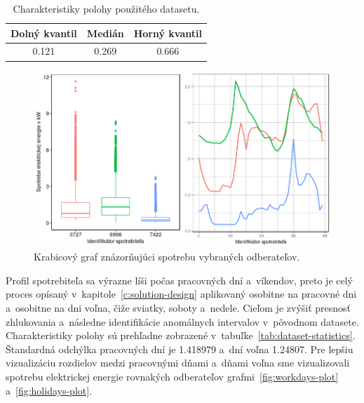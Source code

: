 \documentclass[a4paper,twoside,slovak,12pt,appendix]{article}
\begin{document}
\begin{table}[ht]
  \centering
  \caption{Charakteristiky polohy použitého datasetu.}
  \label{tab:quantile}
  \begin{tabular}{|c|c|c|}
    \hline
    \textbf{Dolný kvantil}  &   \textbf{Medián}		&		\textbf{Horný kvantil} \\ \hline
    0.121								    &   0.269							&		0.666					         \\ \hline
  \end{tabular}
\end{table}

\begin{figure}[htbp]
  \centering
  \includegraphics[width=\textwidth]{sample_plot.png}
  \caption{Krabicový graf znázorňujúci spotrebu vybraných odberateľov.}
  \label{fig:whole-plot}
\end{figure}

Profil spotrebiteľa sa výrazne líši počas pracovných dní a~víkendov, preto je
celý proces opísaný v~kapitole~\ref{c:solution-design} aplikovaný osobitne na
pracovné dni a~osobitne na dni voľna, čiže sviatky, soboty a~nedele. Cieľom je
zvýšiť presnosť zhlukovania a~následne identifikácie anomálnych intervalov
v~pôvodnom datasete. Charakteristiky polohy sú prehľadne zobrazené
v~tabuľke~\ref{tab:dataset-statistics}. Štandardná odchýlka pracovných dní je
1.418979 a~dní voľna 1.24807. Pre lepšiu vizualizáciu rozdielov medzi pracovnými
dňami a~dňami voľna sme vizualizovali spotrebu elektrickej energie rovnakých
odberateľov grafmi~\ref{fig:workdays-plot} a~\ref{fig:holidays-plot}.
\end{document}
